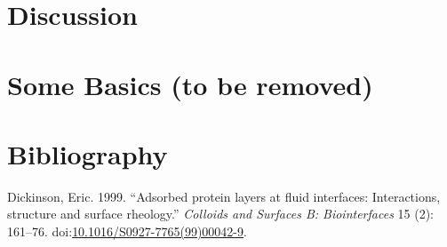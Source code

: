 \documentclass[]{article}
\begin{document}
\section{Discussion}\label{discussion}

\newpage

\section{Some Basics (to be removed)}\label{some-basics-to-be-removed}

\newpage

\section*{Bibliography}\label{bibliography}

\hypertarget{refs}{}
\hypertarget{ref-Dickinson1999}{}
Dickinson, Eric. 1999. ``Adsorbed protein layers at fluid interfaces:
Interactions, structure and surface rheology.'' \emph{Colloids and
Surfaces B: Biointerfaces} 15 (2): 161--76.
doi:\href{https://doi.org/10.1016/S0927-7765(99)00042-9}{10.1016/S0927-7765(99)00042-9}.
\end{document}
